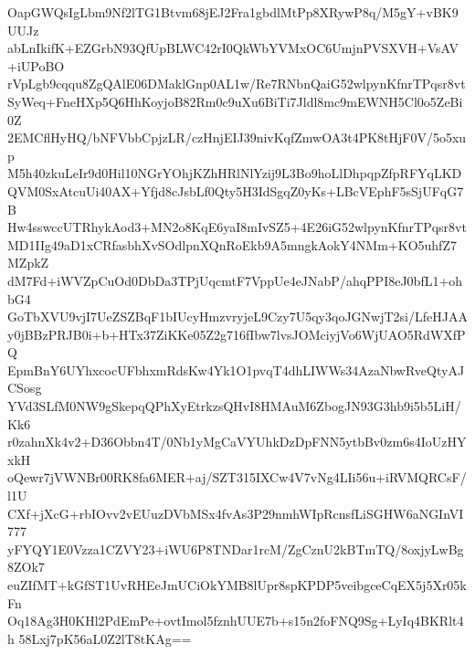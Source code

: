 OapGWQsIgLbm9Nf2lTG1Btvm68jEJ2Fra1gbdlMtPp8XRywP8q/M5gY+vBK9UUJz
abLnIkifK+EZGrbN93QfUpBLWC42rI0QkWbYVMxOC6UmjnPVSXVH+VsAV+iUPoBO
rVpLgb9cqqu8ZgQAlE06DMaklGnp0AL1w/Re7RNbnQaiG52wlpynKfnrTPqsr8vt
SyWeq+FneHXp5Q6HhKoyjoB82Rm0c9uXu6BiTi7Jldl8mc9mEWNH5Cl0o5ZeBi0Z
2EMCflHyHQ/bNFVbbCpjzLR/czHnjEIJ39nivKqfZmwOA3t4PK8tHjF0V/5o5xup
M5h40zkuLeIr9d0Hil10NGrYOhjKZhHRlNlYzij9L3Bo9hoLlDhpqpZfpRFYqLKD
QVM0SxAtcuUi40AX+Yfjd8cJsbLf0Qty5H3IdSgqZ0yKs+LBcVEphF5sSjUFqG7B
Hw4sswccUTRhykAod3+MN2o8KqE6yaI8mIvSZ5+4E26iG52wlpynKfnrTPqsr8vt
MD1IIg49aD1xCRfasbhXvSOdlpnXQnRoEkb9A5mngkAokY4NMm+KO5uhfZ7MZpkZ
dM7Fd+iWVZpCuOd0DbDa3TPjUqcmtF7VppUe4eJNabP/ahqPPI8eJ0bfL1+ohbG4
GoTbXVU9vjI7UeZSZBqF1bIUcyHmzvryjeL9Czy7U5qy3qoJGNwjT2si/LfeHJAA
y0jBBzPRJB0i+b+HTx37ZiKKe05Z2g716fIbw7lvsJOMciyjVo6WjUAO5RdWXfPQ
EpmBnY6UYhxcocUFbhxmRdsKw4Yk1O1pvqT4dhLIWWs34AzaNbwRveQtyAJCSosg
YVd3SLfM0NW9gSkepqQPhXyEtrkzsQHvI8HMAuM6ZbogJN93G3hb9i5b5LiH/Kk6
r0zahnXk4v2+D36Obbn4T/0Nb1yMgCaVYUhkDzDpFNN5ytbBv0zm6s4IoUzHYxkH
oQewr7jVWNBr00RK8fa6MER+aj/SZT315IXCw4V7vNg4LIi56u+iRVMQRCsF/l1U
CXf+jXcG+rbIOvv2vEUuzDVbMSx4fvAs3P29nmhWIpRcnsfLiSGHW6aNGInVI777
yFYQY1E0Vzza1CZVY23+iWU6P8TNDar1rcM/ZgCznU2kBTmTQ/8oxjyLwBg8ZOk7
euZIfMT+kGfST1UvRHEeJmUCiOkYMB8lUpr8spKPDP5veibgceCqEX5j5Xr05kFn
Oq18Ag3H0KHl2PdEmPe+ovtImol5fznhUUE7b+s15n2foFNQ9Sg+LyIq4BKRlt4h
58Lxj7pK56aL0Z2lT8tKAg==
